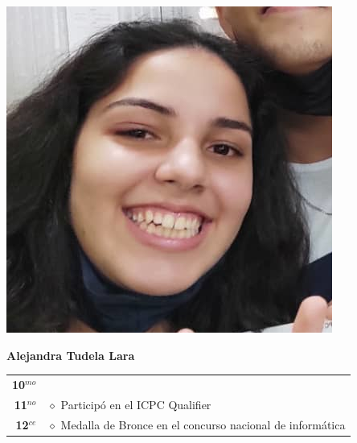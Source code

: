 \begin{minipage}{0.2\textwidth}
	\includegraphics[width=\linewidth]{img/concursantes/alejandra.png} %
\end{minipage}
\hfill
\begin{minipage}{0.7\textwidth}
	\textbf{Alejandra Tudela Lara}
	
	\vspace*{0.1in}
	\begin{tabular}{rl}
		
		\textbf{10$^{mo}$} &   \\
		
		\textbf{11$^{no}$} & $\diamond$ Participó en el ICPC Qualifier \\
		
		\textbf{12$^{ce}$} &  $\diamond$ Medalla de Bronce en el concurso nacional de informática \\
		
		
	\end{tabular}
\end{minipage}

